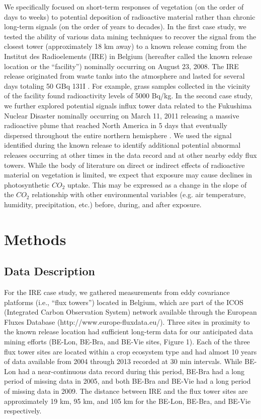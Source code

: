 \documentclass{article}
\begin{document}
We specifically focused on short-term responses of vegetation (on the order of days to weeks) to potential deposition of radioactive material rather than chronic long-term signals (on the order of years to decades). In the first case study, we tested the ability of various data mining techniques to recover the signal from the closest tower (approximately 18 km away) to a known release coming from the Institut des Radioelements (IRE) in Belgium (hereafter called the known release location or the “facility”) nominally occurring on August 23, 2008. The IRE release originated from waste tanks into the atmosphere and lasted for several days totaling 50 GBq 131I \citep{carle2010individual}. For example, grass samples collected in the vicinity of the facility found radioactivity levels of 5000 Bq/kg. In the second case study, we further explored potential signals influx tower data related to the Fukushima Nuclear Disaster nominally occurring on March 11, 2011 releasing a massive radioactive plume that reached North America in 5 days that eventually dispersed throughout the entire northern hemisphere \citep{meszarosPredictabilityDispersionFukushimaderived2016}. We used the signal identified during the known release to identify additional potential abnormal releases occurring at other times in the data record and at other nearby eddy flux towers. While the body of literature on direct or indirect effects of radioactive material on vegetation is limited, we expect that exposure may cause declines in photosynthetic $CO_2$ uptake. This may be expressed as a change in the slope of the $CO_2$ relationship with other environmental variables (e.g. air temperature, humidity, precipitation, etc.) before, during, and after exposure.


\section{Methods}

\subsection{Data Description}

For the IRE case study, we gathered measurements from eddy covariance platforms (i.e., “flux towers”) located in Belgium, which are part of the ICOS (Integrated Carbon Observation System) network available through the European Fluxes Database (http://www.europe-fluxdata.eu/). Three sites in proximity to the known release location had sufficient long-term data for our anticipated data mining efforts (BE-Lon, BE-Bra, and BE-Vie sites, Figure 1). Each of the three flux tower sites are located within a crop ecosystem type and had almost 10 years of data available from 2004 through 2013 recorded at 30 min intervals. While BE-Lon had a near-continuous data record during this period, BE-Bra had a long period of missing data in 2005, and both BE-Bra and BE-Vie had a long period of missing data in 2009. The distance between IRE and the flux tower sites are approximately 19 km, 95 km, and 105 km for the BE-Lon, BE-Bra, and BE-Vie respectively.
\end{document}
